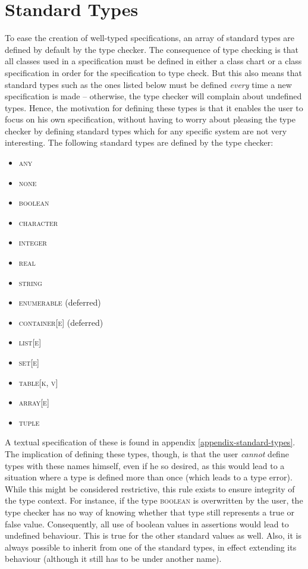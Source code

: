 \section{Standard Types}
\label{implementation-standard-types}
To ease the creation of well-typed specifications, an array of standard types are defined by default by the type checker. The consequence of type checking is that all classes used in a specification must be defined in either a class chart or a class specification in order for the specification to type check. But this also means that standard types such as the ones listed below must be defined \emph{every} time a new specification is made -- otherwise, the type checker will complain about undefined types. Hence, the motivation for defining these types is that it enables the user to focus on his own specification, without having to worry about pleasing the type checker by defining standard types which for any specific system are not very interesting. The following standard types are defined by the type checker:
\begin{itemize}
\item \textsc{any}
\item \textsc{none}
\item \textsc{boolean}
\item \textsc{character}
\item \textsc{integer}
\item \textsc{real}
\item \textsc{string}
\item \textsc{enumerable} (deferred)
\item \textsc{container}[\textsc{e}] (deferred)
\item \textsc{list}[\textsc{e}]
\item \textsc{set}[\textsc{e}]
\item \textsc{table}[\textsc{k}, \textsc{v}]
\item \textsc{array}[\textsc{e}]
\item \textsc{tuple}
\end{itemize}
A textual \bon{} specification of these is found in appendix \ref{appendix-standard-types}. The implication of defining these types, though, is that the user \emph{cannot} define types with these names himself, even if he so desired, as this would lead to a situation where a type is defined more than once (which leads to a type error). While this might be considered restrictive, this rule exists to ensure integrity of the type context. For instance, if the type \textsc{boolean} is overwritten by the user, the type checker has no way of knowing whether that type still represents a true or false value. Consequently, all use of boolean values in assertions would lead to undefined behaviour. This is true for the other standard values as well. Also, it is always possible to inherit from one of the standard types, in effect extending its behaviour (although it still has to be under another name).
